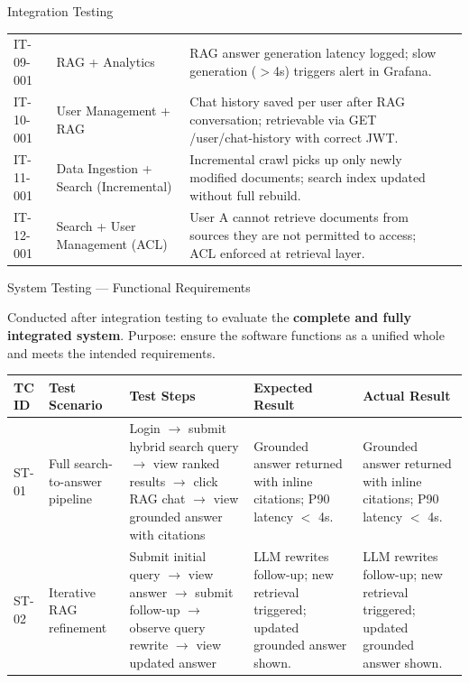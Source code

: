 \documentclass[aspectratio=169,xcolor=dvipsnames]{beamer}
\newcommand{\cmark}{\checkmark}
\newcommand{\tw}{\textwidth}
\begin{document}
\begin{frame}{Integration Testing}
\begin{table}
\begin{tabular}{p{.08\tw}|p{.24\tw}|p{.52\tw}|p{.10\tw}}
      IT-09-001 & RAG + Analytics & RAG answer generation latency logged; slow generation ($>$4s) triggers alert in Grafana. & \textcolor{green!60!black}{\cmark}\\
      IT-10-001 & User Management + RAG & Chat history saved per user after RAG conversation; retrievable via GET /user/chat-history with correct JWT. & \textcolor{green!60!black}{\cmark}\\
      IT-11-001 & Data Ingestion + Search (Incremental) & Incremental crawl picks up only newly modified documents; search index updated without full rebuild. & \textcolor{green!60!black}{\cmark}\\
      IT-12-001 & Search + User Management (ACL) & User A cannot retrieve documents from sources they are not permitted to access; ACL enforced at retrieval layer. & \textcolor{green!60!black}{\cmark}\\
      \bottomrule
    \end{tabular}
  \end{table}
\end{frame}

\begin{frame}{System Testing — Functional Requirements}
  \begin{block}{}
    Conducted after integration testing to evaluate the
    \textbf{complete and fully integrated system}.
    Purpose: ensure the software functions as a unified whole and
    meets the intended requirements.
  \end{block}
  \vspace{.3em}
  \tiny\renewcommand{\arraystretch}{0.88}
  \begin{table}
    \centering
    \begin{tabular}{p{.06\tw}|p{.14\tw}|p{.30\tw}|p{.22\tw}|p{.22\tw}}
      \toprule
      \textbf{TC ID} & \textbf{Test Scenario} & \textbf{Test Steps} & \textbf{Expected Result} & \textbf{Actual Result}\\
      \midrule
      ST-01 & Full search-to-answer pipeline &
        Login $\to$ submit hybrid search query $\to$ view ranked results $\to$ click RAG chat $\to$ view grounded answer with citations &
        Grounded answer returned with inline citations; P90 latency $<$ 4s. &
        Grounded answer returned with inline citations; P90 latency $<$ 4s. \\
      \midrule
      ST-02 & Iterative RAG refinement &
        Submit initial query $\to$ view answer $\to$ submit follow-up $\to$ observe query rewrite $\to$ view updated answer &
        LLM rewrites follow-up; new retrieval triggered; updated grounded answer shown. &
        LLM rewrites follow-up; new retrieval triggered; updated grounded answer shown. \\
      \bottomrule
    \end{tabular}
  \end{table}
\end{frame}
\end{document}
